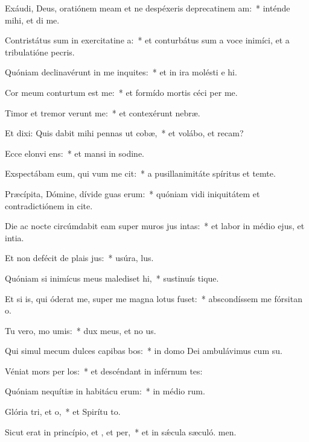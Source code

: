 \item Exáudi, Deus, oratiónem meam et ne despéxeris deprecatinem am:~* inténde mihi, et di me.
\item Contristátus sum in exercitatine a:~* et conturbátus sum a voce inimíci, et a tribulatióne pecris.
\item Quóniam declinavérunt in me inquites:~* et in ira molésti e hi.
\item Cor meum conturtum est  me:~* et formído mortis céci per me.
\item Timor et tremor verunt  me:~* et contexérunt  nebræ.
\item Et dixi: Quis dabit mihi pennas ut cobæ,~* et volábo, et recam?
\item Ecce elonvi ens:~* et mansi in sodine.
\item Exspectábam eum, qui vum me cit:~* a pusillanimitáte spíritus et temte.
\item Præcípita, Dómine, dívide guas erum:~* quóniam vidi iniquitátem et contradictiónem in cite.
\item Die ac nocte circúmdabit eam super muros jus intas:~* et labor in médio ejus, et intia.
\item Et non defécit de plais jus:~* usúra,  lus.
\item Quóniam si inimícus meus malediset hi,~* sustinuís tique.
\item Et si is, qui óderat me, super me magna lotus fuset:~* abscondíssem me fórsitan  o.
\item Tu vero, mo umis:~* dux meus, et no us.
\item Qui simul mecum dulces capibas bos:~* in domo Dei ambulávimus cum su.
\item Véniat mors per los:~* et descéndant in inférnum tes:
\item Quóniam nequítiæ in habitácu erum:~* in médio rum.
\item Glória tri, et o,~* et Spirítu to.
\item Sicut erat in princípio, et , et per,~* et in sǽcula sæculó. men.
